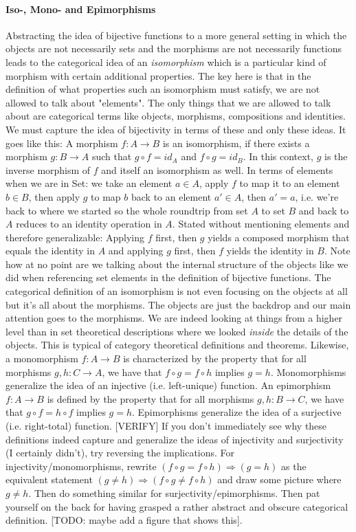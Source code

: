 \paragraph{Iso-, Mono- and Epimorphisms}
Abstracting the idea of bijective functions to a more general setting in which the objects are not necessarily sets and the morphisms are not necessarily functions leads to the categorical idea of an \emph{isomorphism} which is a particular kind of morphism with certain additional properties. The key here is that in the definition of what properties such an isomorphism must satisfy, we are not allowed to talk about "elements". The only things that we are allowed to talk about are categorical terms like objects, morphisms, compositions and identities. We must capture the idea of bijectivity in terms of these and only these ideas. It goes like this: A morphism $f: A \rightarrow B$ is an isomorphism, if there exists a morphism $g: B \rightarrow A$ such that $g \circ f = id_A$ and  $f \circ g = id_B$. In this context, $g$ is the inverse morphism of $f$ and itself an isomorphism as well. In terms of elements when we are in Set: we take an element $a \in A$, apply $f$ to map it to an element $b \in B$, then apply $g$ to map $b$ back to an element $a' \in A$, then $a' = a$, i.e. we're back to where we started so the whole roundtrip from set $A$ to set $B$ and back to $A$ reduces to an identity operation in $A$. Stated without mentioning elements and therefore generalizable: Applying $f$ first, then $g$ yields a composed morphism that equals the identity in $A$ and applying $g$ first, then $f$ yields the identity in $B$. Note how at no point are we talking about the internal structure of the objects like we did when referencing set elements in the definition of bijective functions. The categorical definition of an isomorphism is not even focusing on the objects at all but it's all about the morphisms. The objects are just the backdrop and our main attention goes to the morphisms. We are indeed looking at things from a higher level than in set theoretical descriptions where we looked \emph{inside} the details of the objects. This is typical of category theoretical definitions and theorems. Likewise, a monomorphism $f: A \rightarrow B$ is characterized by the property that for all morphisms $g,h: C \rightarrow A$, we have that $f \circ g = f \circ h$ implies $g = h$. Monomorphisms generalize the idea of an injective (i.e. left-unique) function. An epimorphism $f: A \rightarrow B$ is defined by the property that for all morphisms $g,h: B \rightarrow C$, we have that $g \circ f = h \circ f$ implies $g = h$. Epimorphisms generalize the idea of a surjective (i.e. right-total) function. [VERIFY] If you don't immediately see why these definitions indeed capture and generalize the ideas of injectivity and surjectivity (I certainly didn't), try reversing the implications. For injectivity/monomorphisms, rewrite $(f \circ g = f \circ h) \Rightarrow (g = h)$ as the equivalent statement $(g \neq h) \Rightarrow (f \circ g \neq f \circ h)$ and draw some picture where $g \neq h$. Then do something similar for surjectivity/epimorphisms. Then pat yourself on the back for having grasped a rather abstract and obscure categorical definition. [TODO: maybe add a figure that shows this].

